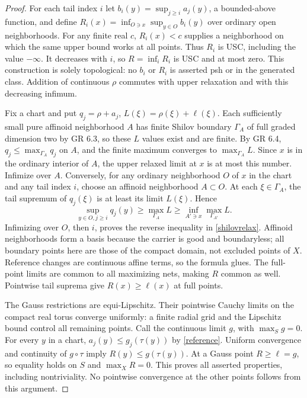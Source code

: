 \documentclass[11pt]{article}
\begin{document}
\begin{proof}
For each tail index $i$ let
$b_i(y)=\sup_{j\ge i}a_j(y)$, a bounded-above function, and define
$R_i(x)=\inf_{O\ni x}\sup_{y\in O}b_i(y)$ over ordinary open
neighborhoods. For any finite real $c$, $R_i(x)<c$ supplies a
neighborhood on which the same upper bound works at all points. Thus
$R_i$ is USC, including the value $-\infty$. It decreases with $i$,
so $R=\inf_iR_i$ is USC and at most zero. This construction is solely
topological: no $b_i$ or $R_i$ is asserted psh or in the generated class.
Addition of continuous $\rho$ commutes with upper relaxation and with
this decreasing infimum.

Fix a chart and put $q_j=\rho+a_j$, $L(\xi)=\rho(\xi)+\ell(\xi)$.
Each sufficiently small pure affinoid neighborhood $A$ has finite
Shilov boundary $\Gamma_A$ of full graded dimension two by GR 6.3,
so these $L$ values exist and are finite. By GR 6.4,
$q_j\le\max_{\Gamma_A}q_j$ on $A$, and the finite maximum converges
to $\max_{\Gamma_A}L$. Since $x$ is in the ordinary interior of $A$,
the upper relaxed limit at $x$ is at most this number. Infimize over $A$.
Conversely, for any ordinary neighborhood $O$ of $x$ in the chart and
any tail index $i$, choose an affinoid neighborhood $A\subset O$.
At each $\xi\in\Gamma_A$, the tail supremum of $q_j(\xi)$ is at
least its limit $L(\xi)$. Hence
\[
 \sup_{y\in O,j\ge i}q_j(y)\ge\max_{\Gamma_A}L
 \ge\inf_{A'\ni x}\max_{\Gamma_{A'}}L.
\]
Infimizing over $O$, then $i$, proves the reverse inequality in
\eqref{shilovrelax}. Affinoid neighborhoods form a basis because the
carrier is good and boundaryless; all boundary points here are those of
the compact domain, not excluded points of $X$. Reference changes
are continuous affine terms, so the formula glues. The full-point
limits are common to all maximizing nets, making $R$ common as well.
Pointwise tail suprema give $R(x)\ge\ell(x)$ at full points.

The Gauss restrictions are equi-Lipschitz. Their pointwise Cauchy
limits on the compact real torus converge uniformly: a finite radial
grid and the Lipschitz bound control all remaining points. Call the
continuous limit $g$, with $\max_Sg=0$. For every $y$ in a chart,
$a_j(y)\le g_j(\tau(y))$ by \eqref{reference}. Uniform convergence
and continuity of $g\circ\tau$ imply $R(y)\le g(\tau(y))$.
At a Gauss point $R\ge\ell=g$, so equality holds on $S$ and
$\max_XR=0$. This proves all asserted properties, including nontriviality.
No pointwise convergence at the other points follows from this argument.
\end{proof}
\end{document}
